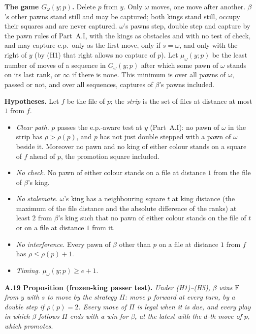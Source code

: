 \textbf{The game $G_\omega(y;p)$.} Delete $p$ from $y$. Only $\omega$ moves, one move after another. $\beta$'s other
pawns stand still and may be captured; both kings stand still, occupy their squares and are never captured. $\omega$'s
pawns step, double step and capture by the pawn rules of Part~A.I, with the kings as obstacles and with no test of check,
and may capture e.p.\ only as the first move, only if $s=\omega$, and only with the right of $y$ (by (H1) that right
allows no capture of $p$). Let $\mu_\omega(y;p)$ be the least number of moves of a sequence in $G_\omega(y;p)$
after which some pawn of $\omega$ stands on its last rank, or $\infty$ if there is none. This minimum is over all pawns of
$\omega$, passed or not, and over all sequences, captures of $\beta$'s pawns included.

\textbf{Hypotheses.} Let $f$ be the file of $p$; the \emph{strip} is the set of files at distance at most $1$ from $f$.
\begin{itemize}
\item[(H1)] \emph{Clear path.} $p$ passes the e.p.-aware test at $y$ (Part~A.I): no pawn of $\omega$ in the strip has
$\rho>\rho(p)$, and $p$ has not just double stepped with a pawn of $\omega$ beside it. Moreover no pawn and no king of
either colour stands on a square of $f$ ahead of $p$, the promotion square included.
\item[(H2)] \emph{No check.} No pawn of either colour stands on a file at distance $1$ from the file of $\beta$'s king.
\item[(H3)] \emph{No stalemate.} $\omega$'s king has a neighbouring square $t$ at king distance (the maximum of the
file distance and the absolute difference of the ranks) at least $2$ from $\beta$'s king such that no pawn of either colour stands on
the file of $t$ or on a file at distance $1$ from it.
\item[(H4)] \emph{No interference.} Every pawn of $\beta$ other than $p$ on a file at distance $1$ from $f$ has
$\rho\le\rho(p)+1$.
\item[(H5)] \emph{Timing.} $\mu_\omega(y;p)\ge e+1$.
\end{itemize}

\textbf{A.19 Proposition (frozen-king passer test).} \emph{Under (H1)--(H5), $\beta$ wins $\mathrm{F}$ from $y$ with $s$
to move by the strategy $\Pi$: move $p$ forward at every turn, by a double step if $\rho(p)=2$. Every move of $\Pi$ is
legal when it is due, and every play in which $\beta$ follows $\Pi$ ends with a win for $\beta$, at the latest with the
$d$-th move of $p$, which promotes.}

